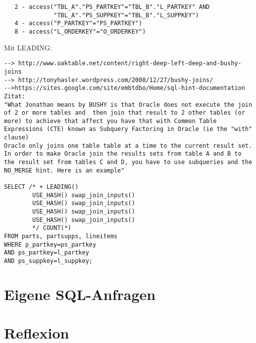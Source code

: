 \documentclass[11pt,a4paper,parskip=half]{scrartcl}
\begin{document}
\begin{lstlisting}
   2 - access("TBL_A"."PS_PARTKEY"="TBL_B"."L_PARTKEY" AND                                                                                                                                                                                                                                                   
              "TBL_A"."PS_SUPPKEY"="TBL_B"."L_SUPPKEY")                                                                                                                                                                                                                                                      
   4 - access("P_PARTKEY"="PS_PARTKEY")                                                                                                                                                                                                                                                                      
   8 - access("L_ORDERKEY"="O_ORDERKEY")                                                                                                                                                                                                                                                                     
\end{lstlisting}

Mit LEADING:
\begin{lstlisting}
--> http://www.oaktable.net/content/right-deep-left-deep-and-bushy-joins
--> http://tonyhasler.wordpress.com/2008/12/27/bushy-joins/
-->https://sites.google.com/site/embtdbo/Home/sql-hint-documentation
Zitat:
"What Jonathan means by BUSHY is that Oracle does not execute the join of 2 or more tables and  then join that result to 2 other tables (or more) to achieve that affect you have that with Common Table Expressions (CTE) known as Subquery Factoring in Oracle (ie the "with" clause)
Oracle only joins one table table at a time to the current result set. In order to make Oracle join the results sets from table A and B to the result set from tables C and D, you have to use subqueries and the NO_MERGE hint. Here is an example"

SELECT /* + LEADING()
        USE_HASH() swap_join_inputs()
        USE_HASH() swap_join_inputs()
        USE_HASH() swap_join_inputs()
        USE_HASH() swap_join_inputs()
        */ COUNT(*)
FROM parts, partsupps, lineitems
WHERE p_partkey=ps_partkey
AND ps_partkey=l_partkey
AND ps_suppkey=l_suppkey;
\end{lstlisting}

\section{Eigene SQL-Anfragen}

\section{Reflexion}
\end{document}
